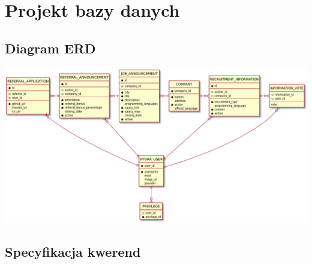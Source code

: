 \documentclass{scrreprt}
\begin{document}
\chapter{Projekt bazy danych}

\section{Diagram ERD}
\includegraphics[width=\textwidth, keepaspectratio]{hydra_db_erd.pdf}

\section{Specyfikacja kwerend}
\end{document}
